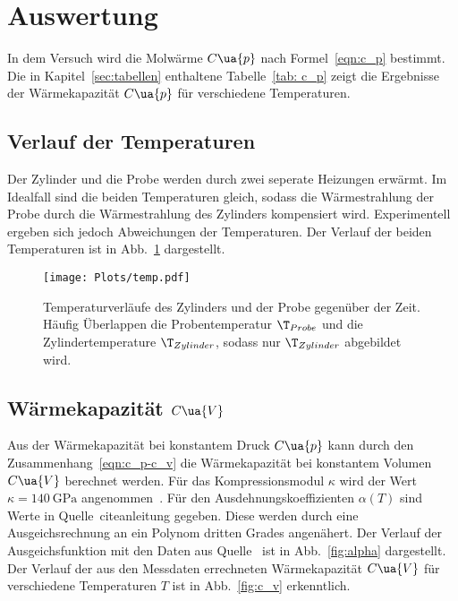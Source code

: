 \section{Auswertung}
\label{sec:auswertung}

In dem Versuch wird die Molwärme $C\ua{p}$ nach Formel~\eqref{eqn:c_p}
bestimmt. Die in Kapitel~\ref{sec:tabellen} enthaltene Tabelle~\ref{tab: c_p}
zeigt die Ergebnisse der Wärmekapazität $C\ua{p}$ für verschiedene Temperaturen.

\subsection{Verlauf der Temperaturen}

Der Zylinder und die Probe werden durch zwei seperate Heizungen erwärmt.
Im Idealfall sind die beiden Temperaturen gleich, sodass die Wärmestrahlung der
Probe durch die Wärmestrahlung des Zylinders kompensiert wird. Experimentell ergeben
sich jedoch Abweichungen der Temperaturen.
Der Verlauf der beiden Temperaturen ist in Abb.~\ref{fig:temp}
dargestellt.

\begin{figure}
  \centering
  \texttt{[image: Plots/temp.pdf]}
  \caption{Temperaturverläufe des Zylinders und der Probe gegenüber der Zeit.
  Häufig Überlappen die Probentemperatur $\T_{Probe}$ und die Zylindertemperature $\T_{Zylinder}$,
  sodass nur $\T_{Zylinder}$ abgebildet wird.}
  \label{fig:temp}
\end{figure}


\subsection{Wärmekapazität $C\ua{V}$}

Aus der Wärmekapazität bei konstantem Druck $C\ua{p}$ kann
durch den Zusammenhang~\eqref{eqn:c_p-c_v} die Wärmekapazität bei
konstantem Volumen $C\ua{V}$ berechnet werden.
Für das Kompressionsmodul $\kappa$ wird der Wert $\kappa = \SI{140}{\giga\pascal}$
angenommen~\cite{kompression}.
Für den Ausdehnungskoeffizienten $\alpha(T)$ sind Werte in Quelle~cite{anleitung}
gegeben. Diese werden durch eine Ausgeichsrechnung an ein Polynom dritten Grades
angenähert. Der Verlauf der Ausgeichsfunktion mit den Daten aus Quelle~\cite{anleitung}
ist in Abb.~\ref{fig:alpha} dargestellt.
Der Verlauf der aus den Messdaten errechneten Wärmekapazität $C\ua{V}$
für verschiedene Temperaturen $T$ ist in Abb.~\ref{fig:c_v} erkenntlich.

